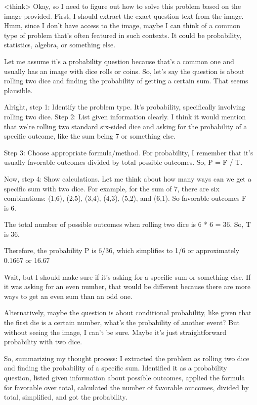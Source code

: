 <think>
Okay, so I need to figure out how to solve this problem based on the image provided. First, I should extract the exact question text from the image. Hmm, since I don't have access to the image, maybe I can think of a common type of problem that's often featured in such contexts. It could be probability, statistics, algebra, or something else.

Let me assume it's a probability question because that's a common one and usually has an image with dice rolls or coins. So, let's say the question is about rolling two dice and finding the probability of getting a certain sum. That seems plausible.

Alright, step 1: Identify the problem type. It's probability, specifically involving rolling two dice. Step 2: List given information clearly. I think it would mention that we're rolling two standard six-sided dice and asking for the probability of a specific outcome, like the sum being 7 or something else.

Step 3: Choose appropriate formula/method. For probability, I remember that it's usually favorable outcomes divided by total possible outcomes. So, P = F / T. 

Now, step 4: Show calculations. Let me think about how many ways can we get a specific sum with two dice. For example, for the sum of 7, there are six combinations: (1,6), (2,5), (3,4), (4,3), (5,2), and (6,1). So favorable outcomes F is 6.

The total number of possible outcomes when rolling two dice is 6 * 6 = 36. So, T is 36.

Therefore, the probability P is 6/36, which simplifies to 1/6 or approximately 0.1667 or 16.67%

Wait, but I should make sure if it's asking for a specific sum or something else. If it was asking for an even number, that would be different because there are more ways to get an even sum than an odd one.

Alternatively, maybe the question is about conditional probability, like given that the first die is a certain number, what's the probability of another event? But without seeing the image, I can't be sure. Maybe it's just straightforward probability with two dice.

So, summarizing my thought process: I extracted the problem as rolling two dice and finding the probability of a specific sum. Identified it as a probability question, listed given information about possible outcomes, applied the formula for favorable over total, calculated the number of favorable outcomes, divided by total, simplified, and got the probability.

